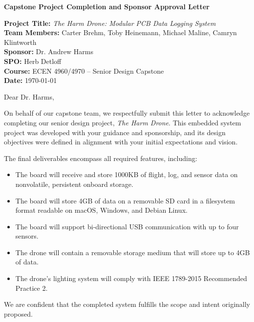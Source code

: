 \documentclass[11pt]{letter}
\begin{document}
\begin{center}
    \large \textbf{Capstone Project Completion and Sponsor Approval Letter}
\end{center}

\vspace{1em}

\noindent\textbf{Project Title:} \textit{The Harm Drone: Modular PCB Data Logging System} \\
\textbf{Team Members:} Carter Brehm, Toby Heinemann, Michael Maline, Camryn Klintworth \\
\textbf{Sponsor:} Dr. Andrew Harms \\
\textbf{SPO:} Herb Detloff \\
\textbf{Course:} ECEN 4960/4970 – Senior Design Capstone \\
\textbf{Date:} \today

\vspace{1.5em}

\noindent Dear Dr. Harms,

\vspace{1em}

On behalf of our capstone team, we respectfully submit this letter to acknowledge completing our senior design project, \textit{The Harm Drone}. This embedded system project was developed with your guidance and sponsorship, and its design objectives were defined in alignment with your initial expectations and vision.

The final deliverables encompass all required features, including:
\begin{itemize}
   \item The board will receive and store 1000KB of flight, log, and sensor data on nonvolatile, persistent onboard storage. 
    \item The board will store 4GB of data on a removable SD card in a filesystem format readable on macOS, Windows, and Debian Linux. 
    \item The board will support bi-directional USB communication with up to four sensors.
    \item The drone will contain a removable storage medium that will store up to 4GB of data.
    \item The drone’s lighting system will comply with IEEE 1789-2015 Recommended Practice 2.
\end{itemize}

We are confident that the completed system fulfills the scope and intent originally proposed.
\end{document}
